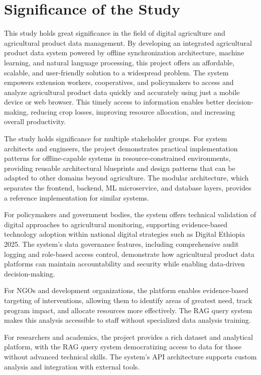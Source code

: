 \section{Significance of the Study}

This study holds great significance in the field of digital agriculture and agricultural product data management. By developing an integrated agricultural product data system powered by offline synchronization architecture, machine learning, and natural language processing, this project offers an affordable, scalable, and user-friendly solution to a widespread problem. The system empowers extension workers, cooperatives, and policymakers to access and analyze agricultural product data quickly and accurately using just a mobile device or web browser. This timely access to information enables better decision-making, reducing crop losses, improving resource allocation, and increasing overall productivity.

The study holds significance for multiple stakeholder groups. For system architects and engineers, the project demonstrates practical implementation patterns for offline-capable systems in resource-constrained environments, providing reusable architectural blueprints and design patterns that can be adapted to other domains beyond agriculture. The modular architecture, which separates the frontend, backend, ML microservice, and database layers, provides a reference implementation for similar systems.

For policymakers and government bodies, the system offers technical validation of digital approaches to agricultural monitoring, supporting evidence-based technology adoption within national digital strategies such as Digital Ethiopia 2025. The system's data governance features, including comprehensive audit logging and role-based access control, demonstrate how agricultural product data platforms can maintain accountability and security while enabling data-driven decision-making.

For NGOs and development organizations, the platform enables evidence-based targeting of interventions, allowing them to identify areas of greatest need, track program impact, and allocate resources more effectively. The RAG query system makes this analysis accessible to staff without specialized data analysis training.

For researchers and academics, the project provides a rich dataset and analytical platform, with the RAG query system democratizing access to data for those without advanced technical skills. The system's API architecture supports custom analysis and integration with external tools.

